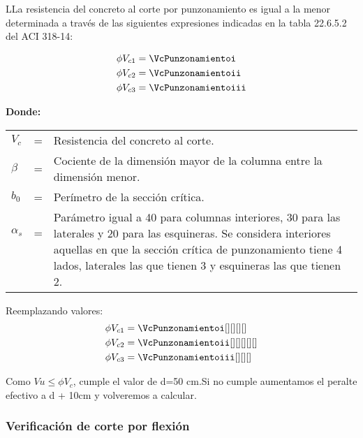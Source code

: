 \begin{theo}
    LLa resistencia del concreto al corte por punzonamiento es igual a la menor
determinada a través de las siguientes expresiones indicadas en la tabla 22.6.5.2
del ACI 318-14:
\end{theo}
\begin{align}
	\phi V_{c1} &= \VcPunzonamientoi \\
	\phi V_{c2} &= \VcPunzonamientoii \\
	\phi V_{c3} &= \VcPunzonamientoiii
\end{align}

\textbf{Donde:}

\begin{table}[h!]
    \centering
    \begin{tabular}{lll}
        $V_c$       &=& Resistencia del concreto al corte.\\
        $\beta$   &=& Cociente de la dimensión mayor de la columna entre la dimensión menor.\\
        $b_0$       &=& Perímetro de la sección crítica.\\
        $\alpha_s$  &=& \multirow{4}{14.6cm}{Parámetro igual a 40 para columnas interiores, 30 para las laterales y 20 para las esquineras. Se considera interiores aquellas en que la sección crítica de punzonamiento tiene 4 lados, laterales las que tienen 3 y esquineras las que tienen 2.}\\
                    & & \\
                    & & \\
                    & & \\
    \end{tabular}
\end{table}
Reemplazando valores:
\begin{align*}
	\phi V_{c1} &= \VcPunzonamientoi[][][][] \\
	\phi V_{c2} &= \VcPunzonamientoii[][][][][]\\
	\phi V_{c3} &= \VcPunzonamientoiii[][][]
\end{align*}

Como $Vu \leq  \phi V_c  $, cumple el valor de d=50 cm.Si no cumple aumentamos el peralte efectivo a
d + 10cm y volveremos a calcular.

\subsubsection{Verificación de corte por flexión}

